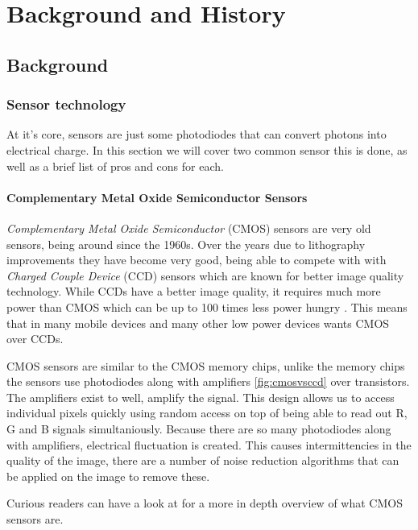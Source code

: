 \chapter{Background and History\label{section:history}}
\section{Background}\label{section:background}

\subsection{Sensor technology}
At it's core, sensors are just some photodiodes that can convert photons
into electrical charge. In this section we will cover two common sensor this is
done, as well as a brief list of pros and cons for each.

\subsubsection{Complementary Metal Oxide Semiconductor Sensors}
\textit{Complementary Metal Oxide Semiconductor} (CMOS) sensors are very old
sensors, being around since the 1960s. Over the years due to lithography
improvements they have become very good, being able to compete with with
\textit{Charged Couple Device} (CCD) sensors which are known for better image
quality technology. While CCDs have a better image quality, it requires much
more power than CMOS which can be up to 100 times less power hungry
\cite{CMOSReview}. This means that in many mobile devices and many other low
power devices wants CMOS over CCDs.

CMOS sensors are similar to the CMOS memory chips, unlike the memory chips the
sensors use photodiodes along with amplifiers \cref{fig:cmosvsccd} over
transistors. The amplifiers exist to well, amplify the signal. This design
allows us to access individual pixels quickly using random access on top of being
able to read out R, G and B signals simultaniously\cite{cmosAlen}. Because
there are so many photodiodes along with amplifiers, electrical fluctuation
is created. This causes intermittencies in the quality of the image, there are
a number of noise reduction algorithms that can be applied on the image to
remove these.

Curious readers can have a look at \cite{CMOSReview} \cite{ieeeCMOS} for a more
in depth overview of what CMOS sensors are.


